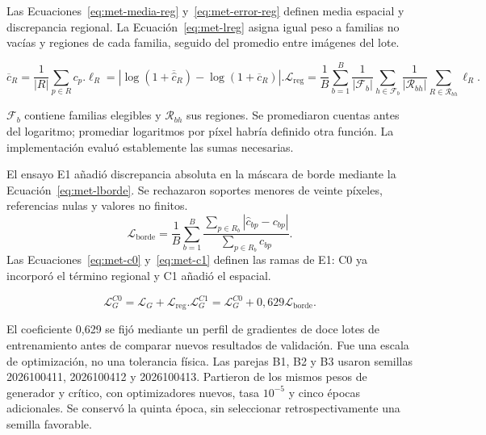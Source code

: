 Las Ecuaciones~\eqref{eq:met-media-reg} y~\eqref{eq:met-error-reg} definen media espacial y discrepancia regional. La Ecuación~\eqref{eq:met-lreg} asigna igual peso a familias no vacías y regiones de cada familia, seguido del promedio entre imágenes del lote.
\begin{samepage}
\begin{subequations}
\begin{equation}\overline c_R=\frac1{|R|}\sum_{p\in R}c_p.\label{eq:met-media-reg}\end{equation}
\begin{equation}\ell_R=|\log(1+\overline{\widehat c}_R)-\log(1+\overline c_R)|.\label{eq:met-error-reg}\end{equation}
\begin{equation}\mathcal L_{\mathrm{reg}}=\frac1B\sum_{b=1}^{B}\frac1{|\mathcal F_b|}\sum_{h\in\mathcal F_b}\frac1{|\mathcal R_{bh}|}\sum_{R\in\mathcal R_{bh}}\ell_R.\label{eq:met-lreg}\end{equation}
\end{subequations}
\end{samepage}
$\mathcal F_b$ contiene familias elegibles y $\mathcal R_{bh}$ sus regiones. Se promediaron cuentas antes del logaritmo; promediar logaritmos por píxel habría definido otra función. La implementación evaluó establemente las sumas necesarias.

El ensayo E1 añadió discrepancia absoluta en la máscara de borde mediante la Ecuación~\eqref{eq:met-lborde}. Se rechazaron soportes menores de veinte píxeles, referencias nulas y valores no finitos.
\begin{equation}\mathcal L_{\mathrm{borde}}=\frac1B\sum_{b=1}^{B}\frac{\sum_{p\in R_b}|\widehat c_{bp}-c_{bp}|}{\sum_{p\in R_b}c_{bp}}.\label{eq:met-lborde}\end{equation}
Las Ecuaciones~\eqref{eq:met-c0} y~\eqref{eq:met-c1} definen las ramas de E1: C0 ya incorporó el término regional y C1 añadió el espacial.
\begin{samepage}
\begin{subequations}
\begin{equation}\mathcal L_G^{C0}=\mathcal L_G+\mathcal L_{\mathrm{reg}}.\label{eq:met-c0}\end{equation}
\begin{equation}\mathcal L_G^{C1}=\mathcal L_G^{C0}+0{,}629\mathcal L_{\mathrm{borde}}.\label{eq:met-c1}\end{equation}
\end{subequations}
\end{samepage}
El coeficiente 0,629 se fijó mediante un perfil de gradientes de doce lotes de entrenamiento antes de comparar nuevos resultados de validación. Fue una escala de optimización, no una tolerancia física. Las parejas B1, B2 y B3 usaron semillas 2026100411, 2026100412 y 2026100413. Partieron de los mismos pesos de generador y crítico, con optimizadores nuevos, tasa $10^{-5}$ y cinco épocas adicionales. Se conservó la quinta época, sin seleccionar retrospectivamente una semilla favorable.

